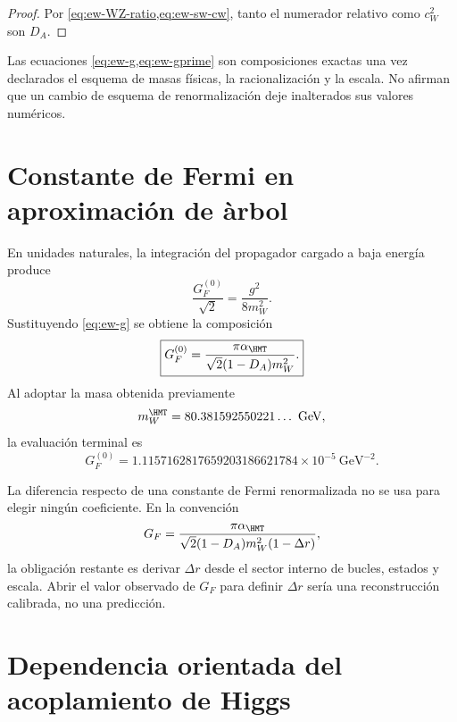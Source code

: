 \begin{proof}
Por \cref{eq:ew-WZ-ratio,eq:ew-sw-cw}, tanto el numerador relativo como
\(c_W^2\) son \(D_A\).
\end{proof}

Las ecuaciones \cref{eq:ew-g,eq:ew-gprime} son composiciones exactas una
vez declarados el esquema de masas f\'isicas, la racionalizaci\'on y la escala. No
afirman que un cambio de esquema de renormalizaci\'on deje inalterados sus
valores num\'ericos.

\section{Constante de Fermi en aproximaci\'on de \`arbol}

En unidades naturales, la integraci\'on del propagador cargado a baja
energ\'ia produce
\begin{equation}
\label{eq:ew-GF-def}
\frac{G_F^{(0)}}{\sqrt2}=\frac{g^2}{8m_W^2}.
\end{equation}
Sustituyendo \cref{eq:ew-g} se obtiene la composici\'on
\begin{equation}
\label{eq:ew-GF}
\boxed{
G_F^{(0)}
=\frac{\pi\alpha_{\HMT}}
{\sqrt2(1-D_A)m_W^2}.}
\end{equation}
Al adoptar la masa obtenida previamente
\begin{equation}
\label{eq:ew-W-output}
m_W^{\HMT}=80.381592550221\ldots\ \mathrm{GeV},
\end{equation}
la evaluaci\'on terminal es
\begin{equation}
\label{eq:ew-GF-value}
\boxed{
G_F^{(0)}
=1.1157162817659203186621784\times10^{-5}\ \mathrm{GeV}^{-2}.}
\end{equation}

La diferencia respecto de una constante de Fermi renormalizada no se usa
para elegir ning\'un coeficiente. En la convenci\'on
\begin{equation}
\label{eq:ew-Delta-r}
G_F
=\frac{\pi\alpha_{\HMT}}
{\sqrt2(1-D_A)m_W^2(1-\Delta r)},
\end{equation}
la obligaci\'on restante es derivar \(\Delta r\) desde el sector interno de
bucles, estados y escala. Abrir el valor observado de \(G_F\) para definir
\(\Delta r\) ser\'ia una reconstrucci\'on calibrada, no una predicci\'on.

\section{Dependencia orientada del acoplamiento de Higgs}


